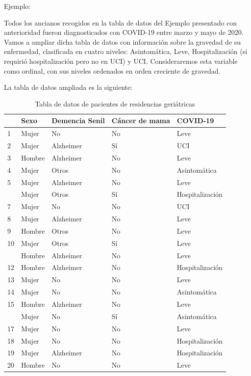 \documentclass[
  spanish,
  letterpaper,
  DIV=11,
  numbers=noendperiod]{scrreprt}
\begin{document}
Ejemplo:

Todos los ancianos recogidos en la tabla de datos del Ejemplo presentado
con anterioridad fueron diagnosticados con COVID-19 entre marzo y mayo
de 2020. Vamos a ampliar dicha tabla de datos con información sobre la
gravedad de su enfermedad, clasificada en cuatro niveles: Asintomática,
Leve, Hospitalización (si requirió hospitalización pero no en UCI) y
UCI. Consideraremos esta variable como ordinal, con sus niveles
ordenados en orden creciente de gravedad.

La tabla de datos ampliada es la siguiente:

\begin{longtable}[t]{lllll}
\caption{\label{tab:tablager3}Tabla de datos de pacientes de residencias geriátricas}\\
\toprule
 & Sexo & Demencia Senil & Cáncer de mama & COVID-19\\
\midrule
1 & Mujer & No & No & Leve\\
2 & Mujer & Alzheimer & Sí & UCI\\
3 & Hombre & Alzheimer & No & Leve\\
4 & Mujer & Otros & No & Asintomática\\
5 & Mujer & Alzheimer & No & Leve\\
\addlinespace
6 & Mujer & Otros & Sí & Hospitalización\\
7 & Mujer & No & No & UCI\\
8 & Mujer & Alzheimer & No & Leve\\
9 & Hombre & Otros & No & Leve\\
10 & Mujer & Otros & Sí & Leve\\
\addlinespace
11 & Hombre & Alzheimer & No & Leve\\
12 & Hombre & Alzheimer & No & Hospitalización\\
13 & Mujer & No & No & Leve\\
14 & Mujer & No & No & Asintomática\\
15 & Hombre & Alzheimer & No & Leve\\
\addlinespace
16 & Mujer & No & Sí & Asintomática\\
17 & Mujer & No & No & Leve\\
18 & Mujer & No & No & Hospitalización\\
19 & Mujer & Alzheimer & No & Hospitalización\\
20 & Hombre & No & No & Leve\\
\bottomrule
\end{longtable}
\end{document}
